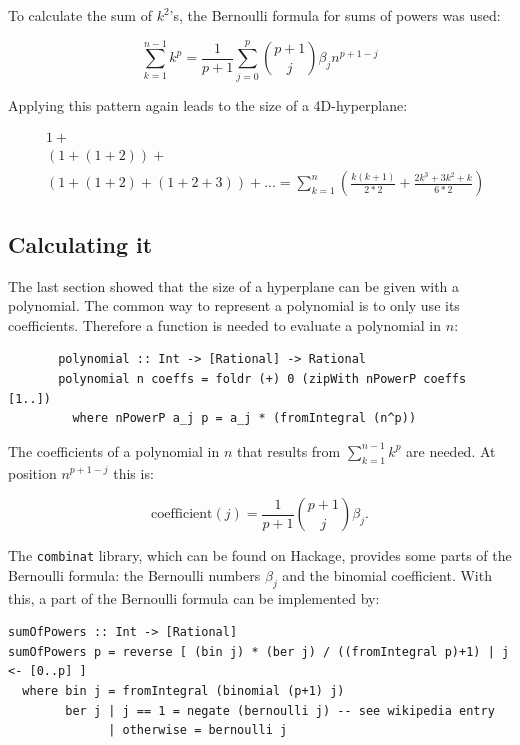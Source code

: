 \documentclass{tmr}
\begin{document}
To calculate the sum of $k^2$'s, the Bernoulli formula for sums of powers was used:

\begin{equation} \label{bernoulli}
\boxed{
\sum_{k=1}^{n-1} k^p = \frac{1}{p+1} \sum_{j=0}^{p} \binom{p+1}{j} \beta_{j} n^{p+1-j}
}
\end{equation}

Applying this pattern again leads to the size of a 4D-hyperplane:

\begin{equation}\label{poly4d}
\begin{split}
 & 1 +\\
 &(1+(1+2) )+ \\
 &(1+(1+2)+(1+2+3)) + ... = \sum_{k=1}^{n} (\frac{ k (k+1) }{2*2}  + \frac{2k^3+3k^2+k}{6*2})
\end{split}
\end{equation}

\subsection {Calculating it}

The last section showed that the size of a hyperplane can be given with a polynomial. The common way to represent a polynomial is to only use its coefficients. Therefore a function is needed to evaluate a polynomial in $n$:
\small
\begin{Verbatim}
       polynomial :: Int -> [Rational] -> Rational
       polynomial n coeffs = foldr (+) 0 (zipWith nPowerP coeffs [1..])
         where nPowerP a_j p = a_j * (fromIntegral (n^p))
\end{Verbatim}

The coefficients of a polynomial in $n$ that results from $\sum_{k=1}^{n-1} k^p$ are needed. At position $n^{p+1-j}$ this is:

\begin{equation} \label{coefficient}
\mbox{coefficient}(j) = \frac{1}{p+1} \binom{p+1}{j} \beta_{j}.
\end{equation}

The \verb|combinat| library, which can be found on Hackage, provides some parts of the Bernoulli formula: the Bernoulli numbers $\beta_{j}$ and the binomial coefficient. With this, a part of the Bernoulli formula can be implemented by:

\small
\begin{Verbatim}
sumOfPowers :: Int -> [Rational]
sumOfPowers p = reverse [ (bin j) * (ber j) / ((fromIntegral p)+1) | j <- [0..p] ]
  where bin j = fromIntegral (binomial (p+1) j)
        ber j | j == 1 = negate (bernoulli j) -- see wikipedia entry
              | otherwise = bernoulli j
\end{Verbatim}
\end{document}
